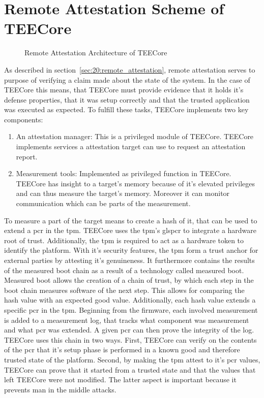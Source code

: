 \section{Remote Attestation Scheme of TEECore}
\begin{figure}
    \begin{center}
        
        \caption{Remote Attestation Architecture of TEECore}
        \label{fig:30:tee_ra}
    \end{center}
\end{figure}
As described in section~\ref{sec:20:remote_attestation}, remote attestation
serves to purpose of verifying a claim made about the state of the system. In
the case of TEECore this means, that TEECore must provide evidence that it holds
it's defense properties, that it was setup correctly and that the trusted
application was executed as expected. To fulfill these tasks, TEECore implements
two key components:
\begin{enumerate}
    \item An attestation manager: This is a privileged module of
          TEECore. TEECore implements services a attestation target can use to
          request an attestation report.
    \item Measurement tools: Implemented as privileged function in TEECore.
          TEECore has insight to a target's memory because of it's elevated
          privileges and can thus measure the target's memory. Moreover it can
          monitor communication which can be parts of the measurement.
\end{enumerate}
To measure a part of the target means to create a hash of it, that can be used
to extend a \gls{pcr} in the \gls{tpm}. TEECore uses the \gls{tpm}'s gls{pcr} to
integrate a hardware root of trust. Additionally, the \gls{tpm} is required to
act as a hardware token to identify the platform. With it's security features,
the \gls{tpm} form a trust anchor for external parties by attesting it's
genuineness. It furthermore contains the results of the measured boot chain as a
result of a technology called measured boot. Measured boot allows the creation
of a chain of trust, by which each step in the boot chain measures software of
the next step. This allows for comparing the hash value with an expected good
value. Additionally, each hash value extends a specific \gls{pcr} in the
\gls{tpm}. Beginning from the firmware, each involved measurement is added to a
measurement log, that tracks what component was measurement and what \gls{pcr}
was extended. A given \gls{pcr} can then prove the integrity of the log. TEECore
uses this chain in two ways. First, TEECore can verify on the contents of the
\gls{pcr} that it's setup phase is performed in a known good and therefore
trusted state of the platform. Second, by making the \gls{tpm} attest to it's
\gls{pcr} values, TEECore can prove that it started from a trusted state and
that the values that left TEECore were not modified. The latter aspect is
important because it prevents man in the middle attacks. \\

